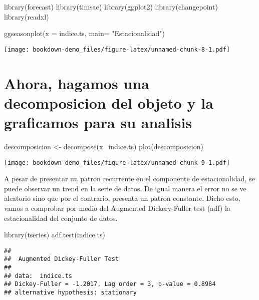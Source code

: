\documentclass[
]{book}
\newenvironment{Shaded}{\begin{snugshade}}{\end{snugshade}}
\newcommand{\AttributeTok}[1]{\textcolor[rgb]{0.77,0.63,0.00}{#1}}
\newcommand{\FunctionTok}[1]{\textcolor[rgb]{0.00,0.00,0.00}{#1}}
\newcommand{\NormalTok}[1]{#1}
\newcommand{\OtherTok}[1]{\textcolor[rgb]{0.56,0.35,0.01}{#1}}
\newcommand{\StringTok}[1]{\textcolor[rgb]{0.31,0.60,0.02}{#1}}
\begin{document}
\begin{Shaded}
\begin{Highlighting}[]
\FunctionTok{library}\NormalTok{(forecast)}
\FunctionTok{library}\NormalTok{(timsac)}
\FunctionTok{library}\NormalTok{(ggplot2)}
\FunctionTok{library}\NormalTok{(changepoint)}
\FunctionTok{library}\NormalTok{(readxl)}

\FunctionTok{ggseasonplot}\NormalTok{(}\AttributeTok{x =}\NormalTok{ indice.ts,}
             \AttributeTok{main=} \StringTok{"Estacionalidad"}\NormalTok{)}
\end{Highlighting}
\end{Shaded}

\texttt{[image: bookdown-demo\_files/figure-latex/unnamed-chunk-8-1.pdf]}

\hypertarget{ahora-hagamos-una-decomposicion-del-objeto-y-la-graficamos-para-su-analisis}{%
\section{Ahora, hagamos una decomposicion del objeto y la graficamos para su analisis}\label{ahora-hagamos-una-decomposicion-del-objeto-y-la-graficamos-para-su-analisis}}

\begin{Shaded}
\begin{Highlighting}[]
\NormalTok{descomposicion }\OtherTok{\textless{}{-}} \FunctionTok{decompose}\NormalTok{(}\AttributeTok{x=}\NormalTok{indice.ts)}
\FunctionTok{plot}\NormalTok{(descomposicion)}
\end{Highlighting}
\end{Shaded}

\texttt{[image: bookdown-demo\_files/figure-latex/unnamed-chunk-9-1.pdf]}

A pesar de presentar un patron recurrente en el componente de estacionalidad, se puede observar un trend en la serie de datos. De igual manera el error no se ve aleatorio sino que por el contrario, presenta un patron constante. Dicho esto, vamos a comprobar por medio del Augmented Dickery-Fuller test (adf) la estacionalidad del conjunto de datos.

\begin{Shaded}
\begin{Highlighting}[]
\FunctionTok{library}\NormalTok{(tseries)}
\FunctionTok{adf.test}\NormalTok{(indice.ts)}
\end{Highlighting}
\end{Shaded}

\begin{verbatim}
## 
##  Augmented Dickey-Fuller Test
## 
## data:  indice.ts
## Dickey-Fuller = -1.2017, Lag order = 3, p-value = 0.8984
## alternative hypothesis: stationary
\end{verbatim}
\end{document}
